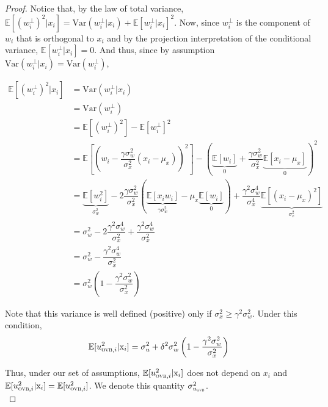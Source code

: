 \documentclass[a4paper, 11pt]{report}
\begin{document}
\begin{proof}
				Notice that, by the law of total variance, $\mathbb{E}[(w_{i}^{\perp})^{2} | x_{i}] = \text{Var}(w_{i}^{\perp} | x_{i}) + \mathbb{E}[w_{i}^{\perp} | x_{i}]^{2}$. Now, since $w_{i}^{\perp}$ is the component of $w_{i}$ that is orthogonal to $x_{i}$ and by the projection interpretation of the conditional variance,  $\mathbb{E}[w_{i}^{\perp} | x_{i}] = 0$. And thus, since by assumption $\text{Var}(w_{i}^{\perp} | x_{i}) = \text{Var}(w_{i}^{\perp})$, 
				
				\begin{align*}
					\mathbb{E}[(w_{i}^{\perp})^{2} | x_{i}] & = \text{Var}(w_{i}^{\perp} | x_{i})\\
					& = \text{Var}(w_{i}^{\perp}) \\
					& = \mathbb{E}[(w_{i}^{\perp})^{2}] - \mathbb{E}[w_{i}^{\perp}]^{2}\\
					& = \mathbb{E}\left[ \left(w_{i} - \dfrac{\gamma\sigma_{w}^{2}}{\sigma_{x}^{2}} (x_{i} - \mu_{x})\right)^{2} \right] - \left(\underbrace{\mathbb{E}[w_{i}]}_{0} + \dfrac{\gamma\sigma_{w}^{2}}{\sigma_{x}^{2}} \underbrace{\mathbb{E}[x_{i} - \mu_{x}]}_{0} \right)^{2}\\
					& = \underbrace{\mathbb{E}[w_{i}^{2}]}_{\sigma_{w}^{2}} - 2 \dfrac{\gamma\sigma_{w}^{2}}{\sigma_{x}^{2}} \left( \underbrace{\mathbb{E}[x_{i}w_{i}]}_{\gamma \sigma_{w}^{2}} - \mu_{x}\underbrace{\mathbb{E}[w_{i}]}_{0} \right) + \dfrac{\gamma^{2}\sigma_{w}^{4}}{\sigma_{x}^{4}} \underbrace{\mathbb{E}[(x_{i} - \mu_{x})^{2}]}_{\sigma_{x}^{2}}\\
					& = \sigma_{w}^{2} - 2 \dfrac{\gamma^{2}\sigma_{w}^{4}}{\sigma_{x}^{2}} + \dfrac{\gamma^{2}\sigma_{w}^{4}}{\sigma_{x}^{2}}\\
					& = \sigma_{w}^{2} - \dfrac{\gamma^{2}\sigma_{w}^{4}}{\sigma_{x}^{2}} \\
					& = \sigma_{w}^{2} \left(1 - \dfrac{\gamma^{2}\sigma_{w}^{2}}{\sigma_{x}^{2}} \right)
				\end{align*}
				
				Note that this variance is well defined (positive) only if $\sigma_{x}^{2} \geq \gamma^{2}\sigma_{w}^{2}$. Under this condition, 
				~
				\begin{equation}
					\mathbb{E}[u_{\textsc{ovb}, i}^{2} | \text{x}_{i}] =  \sigma_{u}^{2} +  \delta^{2} \sigma_{w}^{2} \left(1 - \dfrac{\gamma^{2}\sigma_{w}^{2}}{\sigma_{x}^{2}} \right)
				\end{equation}
				
				Thus, under our set of assumptions, $\mathbb{E}[u_{\textsc{ovb}, i}^{2} | \text{x}_{i}]$ does not depend on $x_{i}$ and $\mathbb{E}[u_{\textsc{ovb}, i}^{2} | \text{x}_{i}] =  \mathbb{E}[u_{\textsc{ovb}, i}^{2}]$. We denote this quantity $\sigma_{u_{\textsc{ovb}}}^{2}$.\\
				

\end{proof}
\end{document}
